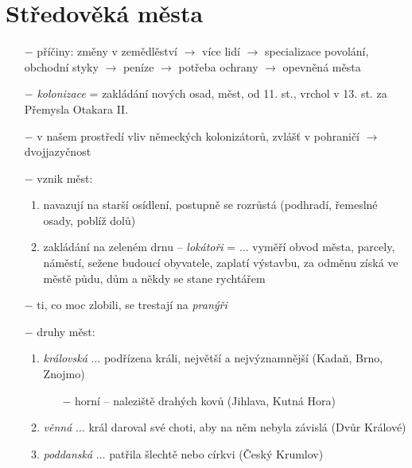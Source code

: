 \documentclass{article}
\begin{document}
\section*{Středověká města}
\begin{itemize}
    \vspace{-0.5em}
    \setlength\itemsep{0.15em}
    \item[$-$] příčiny: změny v zemědlěství $\rightarrow$ více lidí $\rightarrow$ specializace povolání, obchodní styky $\rightarrow$ peníze $\rightarrow$ potřeba ochrany $\rightarrow$ opevněná města
    \item[$-$] \textit{kolonizace} = zakládání nových osad, měst, od 11. st., vrchol v 13. st. za Přemysla Otakara II.
    \item[$-$] v našem prostředí vliv německých kolonizátorů, zvlášť v pohraničí $\rightarrow$ dvojjazyčnost
    \item[$-$] vznik měst:
    \begin{enumerate}
        \vspace{-0.5em}
        \setlength\itemsep{0.15em}
        \item navazují na starší osídlení, postupně se rozrůstá (podhradí, řemeslné osady, poblíž dolů)
        \item zakládání na zeleném drnu -- \textit{lokátoři} =  $\dots$ vyměří obvod města, parcely, náměstí, sežene budoucí obyvatele, zaplatí výstavbu, za odměnu získá ve městě půdu, dům a někdy se stane rychtářem
    \end{enumerate}
    \item[$-$] ti, co moc zlobili, se trestají na \textit{pranýři}
    \item[$-$] druhy měst:
    \begin{enumerate}
        \vspace{-0.5em}
        \setlength\itemsep{0.15em}
        \item \textit{královská} $\dots$ podřízena králi, největší a nejvýznamnější (Kadaň, Brno, Znojmo)
        \begin{itemize}
            \vspace{-0.5em}
            \setlength\itemsep{0.15em}
            \item[$-$] horní -- naleziště drahých kovů (Jihlava, Kutná Hora)
        \end{itemize}
        \item \textit{věnná} $\dots$ král daroval své choti, aby na něm nebyla závislá (Dvůr Králové)
        \item \textit{poddanská} $\dots$ patřila šlechtě nebo církvi (Český Krumlov)

\end{enumerate}
\end{itemize}
\end{document}
